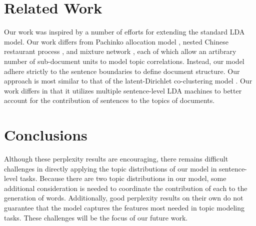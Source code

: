 % 
% 
% 


\section{Related Work} \label{s:related-work} 

Our work was inspired by a number of efforts for extending the standard LDA
model.  Our work differs from Pachinko allocation model \cite{li2006pachinko},
nested Chinese restaurant process \cite{blei2004hierarchical}, and mixture
network \cite{heinrich2009generic}, each of which allow an artibrary number of
sub-document units to model topic correlations.  Instead, our model adhere
strictly to the sentence boundaries to define document structure.  Our approach
is most similar to that of the latent-Dirichlet co-clustering model
\cite{shafiei2006latent}.  Our work differs in that it utilizes multiple
sentence-level LDA machines to better account for the contribution of sentences
to the topics of documents.

\section{Conclusions} \label{s:discussion} 

Although these perplexity results are encouraging, there remains difficult
challenges in directly applying the topic distributions of our model in
sentence-level tasks.  Because there are two topic distributions in our model,
some additional consideration is needed to coordinate the contribution of each
to the generation of words.  Additionally, good perplexity results on their own
do not guarantee that the model captures the features most needed in topic
  modeling tasks.  These challenges will be the focus of our future work.

